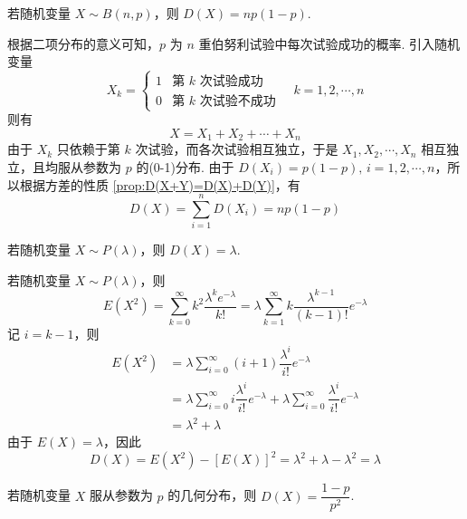 \begin{conclusion}
    若随机变量 $X \sim B(n,p)$，则 $D(X) = np(1-p)$.
\end{conclusion}

\begin{myproof}
    根据二项分布的意义可知，$p$ 为 $n$ 重伯努利试验中每次试验成功的概率. 引入随机变量
    $$
    X_k = \begin{cases}
        1 & \text{第 $k$ 次试验成功} \\
        0 & \text{第 $k$ 次试验不成功}
    \end{cases} \quad k=1,2,\cdots,n
    $$
    则有
    $$
    X = X_1 + X_2 + \cdots + X_n
    $$
    由于 $X_k$ 只依赖于第 $k$ 次试验，而各次试验相互独立，于是 $X_1, X_2, \cdots, X_n$ 相互独立，且均服从参数为 $p$ 的(0-1)分布. 由于 $D(X_i) = p(1-p), \, i=1,2,\cdots,n$，所以根据方差的性质 \ref*{prop:D(X+Y)=D(X)+D(Y)}，有
    $$
    D(X) = \sum_{i=1}^n D(X_i) = np(1-p)
    $$
\end{myproof}

\begin{conclusion}
    若随机变量 $X \sim P(\lambda)$，则 $D(X) = \lambda$.
\end{conclusion}

\begin{myproof}
    若随机变量 $X \sim P(\lambda)$，则
    $$
    E(X^2) = \sum_{k=0}^{\infty} k^2 \dfrac{\lambda^k e^{-\lambda}}{k!} = \lambda \sum_{k=1}^{\infty} k \dfrac{\lambda^{k-1}}{(k-1)!} e^{-\lambda}
    $$
    记 $i=k-1$，则
    $$
    \begin{aligned}
        E(X^2) &= \lambda \sum_{i=0}^{\infty} (i+1) \dfrac{\lambda^i}{i!} e^{-\lambda} \\
        &= \lambda \sum_{i=0}^{\infty} i \dfrac{\lambda^i}{i!} e^{-\lambda} + \lambda \sum_{i=0}^{\infty} \dfrac{\lambda^i}{i!} e^{-\lambda} \\
        &= \lambda^2 + \lambda
    \end{aligned}
    $$
    由于 $E(X) = \lambda$，因此
    $$
    D(X) = E(X^2) - [E(X)]^2 = \lambda^2 + \lambda - \lambda^2 = \lambda
    $$
\end{myproof}

\begin{conclusion}
    若随机变量 $X$ 服从参数为 $p$ 的几何分布，则 $D(X) = \dfrac{1-p}{p^2}$.
\end{conclusion}

